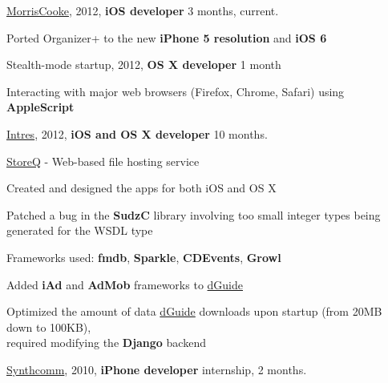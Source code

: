 \documentclass[letterpaper]{article}
\renewenvironment{itemize}{
  \begin{list}{}{
    \setlength{\leftmargin}{1.5em}
  }
}{
  \end{list}
}
\begin{document}
\begin{itemize}
    \item \href{http://www.morriscooke.com}{MorrisCooke}, 2012, {\bf iOS developer} 3 months, current.
		\begin{itemize}

            \item Ported Organizer+ to the new {\bf iPhone 5 resolution} and {\bf iOS 6}

		\end{itemize}

	\item Stealth-mode startup, 2012, {\bf OS X developer} 1 month
		\begin{itemize}

			\item Interacting with major web browsers (Firefox, Chrome, Safari) using {\bf AppleScript}

		\end{itemize}

    \item \href{http://intres.com.pl}{Intres}, 2012, {\bf iOS and OS X developer} 10 months.
		\begin{itemize}
            \item \href{http://storeq.com}{StoreQ} - Web-based file hosting service
                \begin{itemize}
                    \item Created and designed the apps for both iOS and OS X
                    \item Patched a bug in the {\bf SudzC} library involving too small integer types being generated for the WSDL type
                    \item Frameworks used: {\bf fmdb}, {\bf Sparkle}, {\bf CDEvents}, {\bf Growl}
                \end{itemize}

            \item Added {\bf iAd} and {\bf AdMob} frameworks to \href{http://dguide.pl}{dGuide}

            \item Optimized the amount of data \href{http://dguide.pl}{dGuide} downloads upon startup (from 20MB down to 100KB),\\
                required modifying the {\bf Django} backend

    \end{itemize}

    \item \href{http://www.linkedin.com/company/synthcomm-sp.-z-o.o.}{Synthcomm}, 2010, {\bf iPhone developer} internship, 2 months.
		\begin{itemize}


\end{itemize}
\end{itemize}
\end{document}
